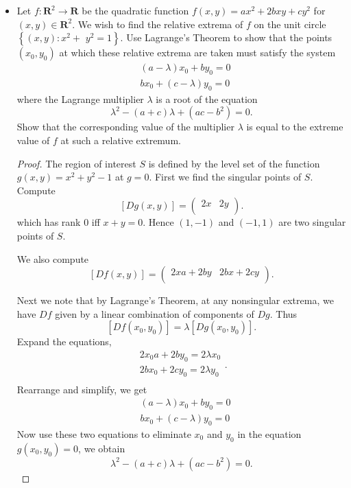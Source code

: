 \begin{itemize}
\item [42.P.] Let $f: \boldsymbol{R}^2 \rightarrow \boldsymbol{R}$ be the quadratic function $f(x, y)=a x^2+2 b x y+c y^2$ for $(x, y) \in \boldsymbol{R}^2$. We wish to find the relative extrema of $f$ on the unit circle $\left\{(x, y): x^2+\right.$ $\left.y^2=1\right\}$. Use Lagrange's Theorem to show that the points $\left(x_0, y_0\right)$ at which these relative extrema are taken must satisfy the system
\[
\begin{aligned}
& (a-\lambda) x_0+b y_0=0 \\
& b x_0+(c-\lambda) y_0=0
\end{aligned}
\]
where the Lagrange multiplier $\lambda$ is a root of the equation
\[
\lambda^2-(a+c) \lambda+\left(a c-b^2\right)=0 .
\]
Show that the corresponding value of the multiplier $\lambda$ is equal to the extreme value of $f$ at such a relative extremum.
\begin{proof}
	The region of interest $S$ is defined by the level set of the function $g(x,y) = x^2 + y^2 - 1$ at $g = 0$.
	First we find the singular points of $S$. Compute
	\[
		[Dg(x,y)]=
		\begin{pmatrix}
			2x & 2y \\
		\end{pmatrix}
	.\] 
	which has rank $0$ iff $x+y = 0$. Hence $(1,-1)$ and $(-1,1)$ are two singular points of $S$.

	We also compute
	\[
		[Df(x,y)] =
		\begin{pmatrix}
			2xa+2by & 2bx+2cy \\
		\end{pmatrix}
	.\] 

	Next we note that by Lagrange's Theorem, at any nonsingular extrema, we have $Df$ given by a linear combination of components of $Dg$. Thus
	 \[
		 [Df(x_0,y_0)] = \lambda [Dg(x_0,y_0)]
	.\] 
	Expand the equations,
	\[
		\begin{matrix}
			2 x_0 a + 2 b y_0 = 2 \lambda x_0 \\
			2 b x_0 + 2 c y_0 = 2 \lambda y_0 \\
		\end{matrix}
	.\] 
	Rearrange and simplify, we get
\[
\begin{aligned}
& (a-\lambda) x_0+b y_0=0 \\
& b x_0+(c-\lambda) y_0=0
\end{aligned}
\]
	Now use these two equations to eliminate $x_0$ and $y_0$ in the equation $g(x_0, y_0) = 0$, we obtain
	\[
\lambda^2-(a+c) \lambda+\left(a c-b^2\right)=0 
	.\] 


\end{proof}
\end{itemize}
